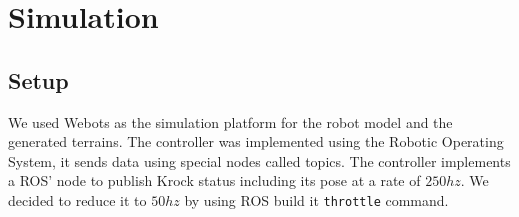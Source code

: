 \documentclass[../document.tex]{subfiles}
\begin{document}


\section{Simulation}
\subsection{Setup}
We used Webots as the simulation platform for the robot model and the generated terrains. The controller was implemented using the Robotic Operating System, it sends data using special nodes called topics. The controller implements a ROS' node to publish Krock status including its pose at a rate of $250hz$. We decided to reduce it to $50hz$ by using ROS build it \texttt{throttle} command. 
\end{document}
